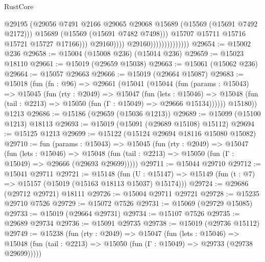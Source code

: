 \begin{lexlean}{RustCore}
\begin{coremodule}
                                                @29195
                                                (@29056
                                                  @7491
                                                  @2166
                                                  @29065
                                                  @29068
                                                  @15689
                                                  (@15569 (@15691 @7492 @2172)))
                                                @15689
                                                (@15569 (@15691 @7482 @7498)))
                                              @15707
                                              @15711
                                              @15716
                                              @15721
                                              @15727
                                              @17166)))
                                        @29160))))
                                @29160))))))))))))))
@29654 := @15002 @236
@29658 := @15004 (@15008 @236) (@15014 @236)
@29659 := @15023 @18110
@29661 := @15019 (@29659 @15038)
@29663 := @15061 (@15062 @236)
@29664 := @15057 @29663
@29666 := @15019 (@29664 @15087)
@29683 := @15018
    (fun (fn : @96) =>
    @29661
      (@15041
        (@15044
          (fun (params : @15043) =>
          @15045
            (fun (rty : @2049) =>
            @15047
              (fun (lets : @15046) =>
              @15048 (fun (tail : @2213) => @15050 (fun (Γ : @15049) => @29666 @15134))))))
        @15180))
    @1213
@29686 := @15186 (@29659 (@15036 @1213))
@29689 := @15099 (@15100 @1213) @18113
@29693 := @15019 (@15091 (@29689 @15108) @15112)
@29694 := @15125 @1213
@29699 := @15122 (@15124 @29694 @18116 @15080 @15082)
@29710 := fun (params : @15043) =>
  @15045
    (fun (rty : @2049) =>
    @15047
      (fun (lets : @15046) =>
      @15048 (fun (tail : @2213) => @15050 (fun (Γ : @15049) => @29666 (@29693 @29699)))))
@29711 := @15044 @29710
@29712 := @15041 @29711
@29721 := @15148
    (fun (U : @15147) => @15149 (fun (t : @7) => @15157 (@15019 (@15163 @18113 @15037) @15174)))
@29724 := @29686 (@29712 @29721) @18111
@29726 := @15004 @29711 @29721
@29728 := @15235 @29710 @7526
@29729 := @15072 @7526
@29731 := @15069 (@29729 @15085)
@29733 := @15019 (@29664 @29731)
@29734 := @15107 @7526
@29735 := @29689 @29734
@29736 := @15091 @29735
@29738 := @15019 (@29736 @15112)
@29749 := @15238
    (fun (rty : @2049) =>
    @15047
      (fun (lets : @15046) =>
      @15048 (fun (tail : @2213) => @15050 (fun (Γ : @15049) => @29733 (@29738 @29699)))))

\end{coremodule}
\end{lexlean}
